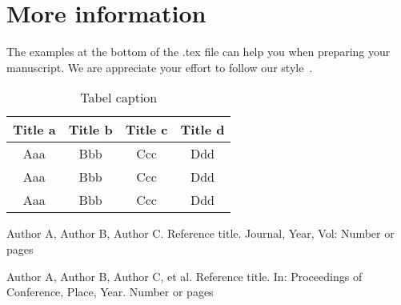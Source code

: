 \documentclass{SCIS2019}
\begin{document}
\section{More information}
The examples at the bottom of the .tex file can help you when preparing your manuscript. We are appreciate your effort to follow our style~\cite{1,2}.


\newpage
\begin{table}[!t]
\footnotesize
\caption{Tabel caption}
\label{tab1}
\tabcolsep 49pt %
\begin{tabular*}{\textwidth}{cccc}
\toprule
  Title a & Title b & Title c & Title d \\\hline
  Aaa & Bbb & Ccc\footnote & Ddd\\
  Aaa & Bbb & Ccc\footnote & Ddd\\
  Aaa & Bbb & Ccc & Ddd\\
\bottomrule
\end{tabular*}
\end{table}





\begin{thebibliography}{99}

 Author A, Author B, Author C. Reference title. Journal, Year, Vol: Number or pages

 Author A, Author B, Author C, et al. Reference title. In: Proceedings of Conference, Place, Year. Number or pages

\end{thebibliography}


\end{document}

